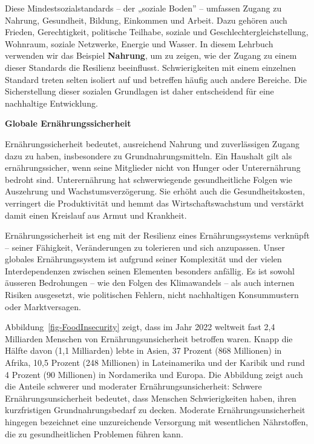 \documentclass[
  nswissgerman,
  a4paper,
  openany]{book}
\begin{document}
Diese Mindestsozialstandards -- der „soziale Boden'' -- umfassen Zugang
zu Nahrung, Gesundheit, Bildung, Einkommen und Arbeit. Dazu gehören auch
Frieden, Gerechtigkeit, politische Teilhabe, soziale und
Geschlechtergleichstellung, Wohnraum, soziale Netzwerke, Energie und
Wasser. In diesem Lehrbuch verwenden wir das Beispiel \textbf{Nahrung},
um zu zeigen, wie der Zugang zu einem dieser Standards die Resilienz
beeinflusst. Schwierigkeiten mit einem einzelnen Standard treten selten
isoliert auf und betreffen häufig auch andere Bereiche. Die
Sicherstellung dieser sozialen Grundlagen ist daher entscheidend für
eine nachhaltige Entwicklung.

\textbf{Globale Ernährungssicherheit}

Ernährungssicherheit bedeutet, ausreichend Nahrung und zuverlässigen
Zugang dazu zu haben, insbesondere zu Grundnahrungsmitteln. Ein Haushalt
gilt als ernährungssicher, wenn seine Mitglieder nicht von Hunger oder
Unterernährung bedroht sind. Unterernährung hat schwerwiegende
gesundheitliche Folgen wie Auszehrung und Wachstumsverzögerung. Sie
erhöht auch die Gesundheitskosten, verringert die Produktivität und
hemmt das Wirtschaftswachstum und verstärkt damit einen Kreislauf aus
Armut und Krankheit.

Ernährungssicherheit ist eng mit der Resilienz eines Ernährungssystems
verknüpft -- seiner Fähigkeit, Veränderungen zu tolerieren und sich
anzupassen. Unser globales Ernährungssystem ist aufgrund seiner
Komplexität und der vielen Interdependenzen zwischen seinen Elementen
besonders anfällig. Es ist sowohl äusseren Bedrohungen -- wie den Folgen
des Klimawandels -- als auch internen Risiken ausgesetzt, wie
politischen Fehlern, nicht nachhaltigen Konsummustern oder
Marktversagen.

Abbildung~\ref{fig-FoodInsecurity} zeigt, dass im Jahr 2022 weltweit
fast 2,4 Milliarden Menschen von Ernährungsunsicherheit betroffen waren.
Knapp die Hälfte davon (1,1 Milliarden) lebte in Asien, 37 Prozent (868
Millionen) in Afrika, 10,5 Prozent (248 Millionen) in Lateinamerika und
der Karibik und rund 4 Prozent (90 Millionen) in Nordamerika und Europa.
Die Abbildung zeigt auch die Anteile schwerer und moderater
Ernährungsunsicherheit: Schwere Ernährungsunsicherheit bedeutet, dass
Menschen Schwierigkeiten haben, ihren kurzfristigen Grundnahrungsbedarf
zu decken. Moderate Ernährungsunsicherheit hingegen bezeichnet eine
unzureichende Versorgung mit wesentlichen Nährstoffen, die zu
gesundheitlichen Problemen führen kann.
\end{document}
